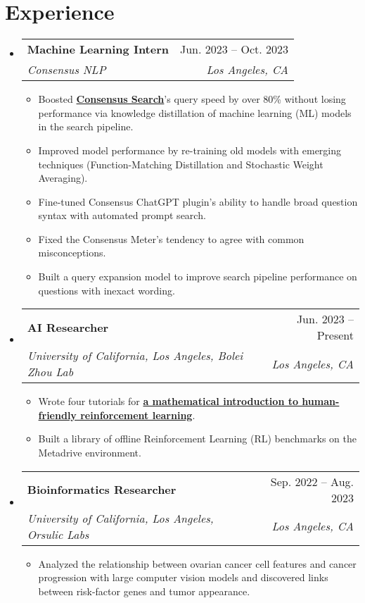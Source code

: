 \documentclass[letterpaper,11pt]{article}
\makeatletter
\newcommand{\resumeItem}[1]{
  \item\small{
    {#1 \vspace{-2pt}}
  }
}
\newcommand{\resumeSubheading}[4]{
  \vspace{-2pt}\item
    \begin{tabular*}{0.97\textwidth}[t]{l@{\extracolsep{\fill}}r}
      \textbf{#1} & #2 \\
      \textit{\small#3} & \textit{\small #4} \\
    \end{tabular*}\vspace{-7pt}
}
\newcommand{\resumeSubSubheading}[2]{
    \item
    \begin{tabular*}{0.97\textwidth}{l@{\extracolsep{\fill}}r}
      \textit{\small#1} & \textit{\small #2} \\
    \end{tabular*}\vspace{-7pt}
}
\newcommand{\resumeSubHeadingListStart}{\begin{itemize}[leftmargin=0.15in, label={}]}
\newcommand{\resumeSubHeadingListEnd}{\end{itemize}}
\newcommand{\resumeItemListStart}{\begin{itemize}}
\newcommand{\resumeItemListEnd}{\end{itemize}\vspace{-5pt}}
\makeatother
\begin{document}
\section{Experience}
  \resumeSubHeadingListStart

    \resumeSubheading
      {Machine Learning Intern}{Jun. 2023 -- Oct. 2023}
      {Consensus NLP}{Los Angeles, CA}
      \resumeItemListStart
        \resumeItem{Boosted \textbf{\href{https://consensus.app}{Consensus Search}}'s query speed by over 80\% without losing performance via knowledge distillation of machine learning (ML) models in the search pipeline.}
        \resumeItem{Improved model performance by re-training old models with emerging techniques (Function-Matching Distillation and Stochastic Weight Averaging).}
        \resumeItem{Fine-tuned Consensus ChatGPT plugin's ability to handle broad question syntax with automated prompt search.}
        \resumeItem{Fixed the Consensus Meter's tendency to agree with common misconceptions.}
        \resumeItem{Built a query expansion model to improve search pipeline performance on questions with inexact wording.}

      \resumeItemListEnd
      
    \resumeSubheading
      {AI Researcher}{Jun. 2023 -- Present}
      {University of California, Los Angeles, Bolei Zhou Lab}{Los Angeles, CA}
      \resumeItemListStart
        \resumeItem{Wrote four tutorials for \textbf{\href{https://github.com/wz-ml/MetaDrive-Tutorials}{a mathematical introduction to human-friendly reinforcement learning}}.}
        \resumeItem{Built a library of offline Reinforcement Learning (RL) benchmarks on the Metadrive environment.}
    \resumeItemListEnd
    
    \resumeSubheading
      {Bioinformatics Researcher}{Sep. 2022 -- Aug. 2023}
      {University of California, Los Angeles, Orsulic Labs}{Los Angeles, CA}
      \resumeItemListStart
        \resumeItem{Analyzed the relationship between ovarian cancer cell features and cancer progression with large computer vision models and discovered links between risk-factor genes and tumor appearance.}
    \resumeItemListEnd
  \resumeSubHeadingListEnd
\end{document}
